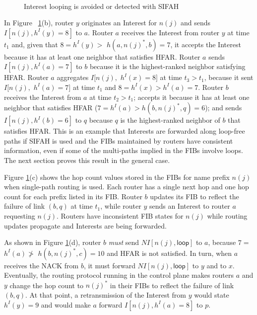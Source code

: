 \documentclass{ancs15-alternate}
\begin{document}
\vspace{-0.1in}
\begin{figure}[h]
\begin{centering}
    \mbox{
      }
 \vspace{-0.1in}
   \caption{Interest looping is avoided or detected with SIFAH
   }
   \label{no-loop}
\end{centering} 
\end{figure}  

In Figure ~\ref{no-loop}(b),  router $y$ originates an Interest for 
$n(j)$ and sends $I[n(j), h^I(y) = 8]$
to $a$. Router $a$ receives the Interest from router $y$ at time $t_1$ and, 
given that $8 = h^I(y) >$ $h(a, n(j)^*, b) = 7$, 
it accepts the Interest because it has at least one neighbor
that satisfies HFAR. Router $a$ sends  $I[n(j), h^I(a) = 7]$ to $b$ because 
it is the highest-ranked neighbor satisfying HFAR.  Router $a$ aggregates $I[n(j),$ $ h^I(x) = 8]$ at time $t_3 > t_1$, because it sent $I[n(j),$ $ h^I(a) = 7]$ at time $t_1$ and $8 = h^I(x) > h^I(a) = 7$. 
Router $b$ receives the Interest from $a$ at time $t_2 > t_1$;  
accepts it because it has at least one neighbor that satisfies HFAR
($7 = h^I(a) > h(b, n(j)^*, q) = 6$); and sends $I[n(j), h^I(b) = 6]$ to $q$ because  $q$ is the highest-ranked neighbor of $b$ that satisfies HFAR.  
This is an example that Interests are forwarded along loop-free paths 
if SIFAH is used and the FIBs maintained by routers have consistent information, even if some of the multi-paths implied in the FIBs involve loops.
The next section proves this result in the general case.


Figure \ref{no-loop}(c) shows the hop count values stored in the FIBs for name prefix $n(j)$  when single-path routing is used. Each router has a single next hop and one hop count for each prefix listed in its FIB.  
Router $b$ updates its FIB to reflect the failure of link $(b, q)$  at time $t_1$, while router $y$ sends an Interest to router $a$ requesting $n(j)$.
Routers have inconsistent FIB states for $n(j)$ while routing updates propagate and Interests are being forwarded.

As shown in Figure \ref{no-loop}(d), router $b$ {\em must} send  $NI[n(j),  \mathsf{loop}]$ to $a$, 
because $7 = $ $h^I(a) \not> $ $h(b, n(j)^*, c) = 10$ and HFAR is not satisfied. In turn, when $a$ receives the NACK from $b$, it must forward $NI[n(j),  \mathsf{loop}]$  to $y$ and to $x$. Eventually, the routing protocol running in the control plane makes routers $a$ and $y$ change the hop count to $n(j)^*$ in their FIBs to reflect the failure of link $(b, q)$. At that point, a retransmission of the Interest from $y$ would state $h^I(y) = 9$ and would make $a$ forward  $I[n(j), h^I(a) = 8]$ to $p$.
\end{document}

